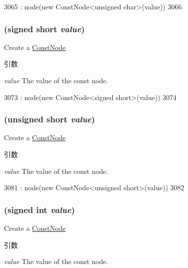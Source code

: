 \begin{DoxyCode}
3065         : node(new ConstNode<unsigned char>(value))
3066     { }
\end{DoxyCode}
\hypertarget{classStats_1_1Temp_a007262659fb356af70d3fa073e1f8ecc}{
\subsubsection[{Temp}]{ (signed short {\em value})}}
\label{classStats_1_1Temp_a007262659fb356af70d3fa073e1f8ecc}
Create a \hyperlink{classStats_1_1ConstNode}{ConstNode} 
\begin{DoxyParams}{引数}
\item[{\em value}]The value of the const node. \end{DoxyParams}



\begin{DoxyCode}
3073         : node(new ConstNode<signed short>(value))
3074     { }
\end{DoxyCode}
\hypertarget{classStats_1_1Temp_a9962ba91d7f788905fdd0517164addc2}{
\subsubsection[{Temp}]{ (unsigned short {\em value})}}
\label{classStats_1_1Temp_a9962ba91d7f788905fdd0517164addc2}
Create a \hyperlink{classStats_1_1ConstNode}{ConstNode} 
\begin{DoxyParams}{引数}
\item[{\em value}]The value of the const node. \end{DoxyParams}



\begin{DoxyCode}
3081         : node(new ConstNode<unsigned short>(value))
3082     { }
\end{DoxyCode}
\hypertarget{classStats_1_1Temp_a6416d23d572b589f2bc19cccec23acb3}{
\subsubsection[{Temp}]{ (signed int {\em value})}}
\label{classStats_1_1Temp_a6416d23d572b589f2bc19cccec23acb3}
Create a \hyperlink{classStats_1_1ConstNode}{ConstNode} 
\begin{DoxyParams}{引数}
\item[{\em value}]The value of the const node. \end{DoxyParams}



